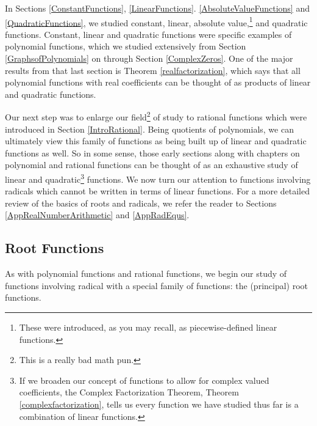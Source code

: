 \documentclass{ximera}
\begin{document}
	\author{Stitz-Zeager}




\setcounter{footnote}{0}

\label{RootRadicalFunctions}

In Sections \ref{ConstantFunctions}, \ref{LinearFunctions}. \ref{AbsoluteValueFunctions} and \ref{QuadraticFunctions}, we studied constant, linear,  absolute value,\footnote{These were introduced, as you may recall, as piecewise-defined linear functions.} and quadratic functions. Constant, linear and quadratic functions were specific examples of polynomial functions, which we studied extensively from Section \ref{GraphsofPolynomials} on through Section \ref{ComplexZeros}.  One of the major results from that last section is Theorem \ref{realfactorization}, which says that all polynomial functions with real coefficients can be thought of as products of linear and quadratic functions.  

Our next step was to enlarge our field\footnote{This is a really bad math pun.} of study to rational functions which were introduced in Section \ref{IntroRational}.  Being quotients of polynomials, we can ultimately view this family of functions as being built up of linear and quadratic functions as well.  So in some sense, those early sections along with chapters on  polynomial and rational functions can be thought of as an exhaustive study of linear and quadratic\footnote{If we broaden our concept of functions to allow for complex valued coefficients, the Complex Factorization Theorem, Theorem \ref{complexfactorization}, tells us every function we have studied thus far is a combination of linear functions.} functions.  We now turn our attention to functions involving radicals which cannot be written in terms of linear functions.  For a more detailed review of the basics of roots and radicals, we refer the reader to Sections \ref{AppRealNumberArithmetic} and  \ref{AppRadEqus}.  




\subsection{Root Functions}
\label{RootFunctions}

As with polynomial functions and rational functions, we begin our study of functions involving radical with a special family of functions: the (principal) root functions.
\end{document}
